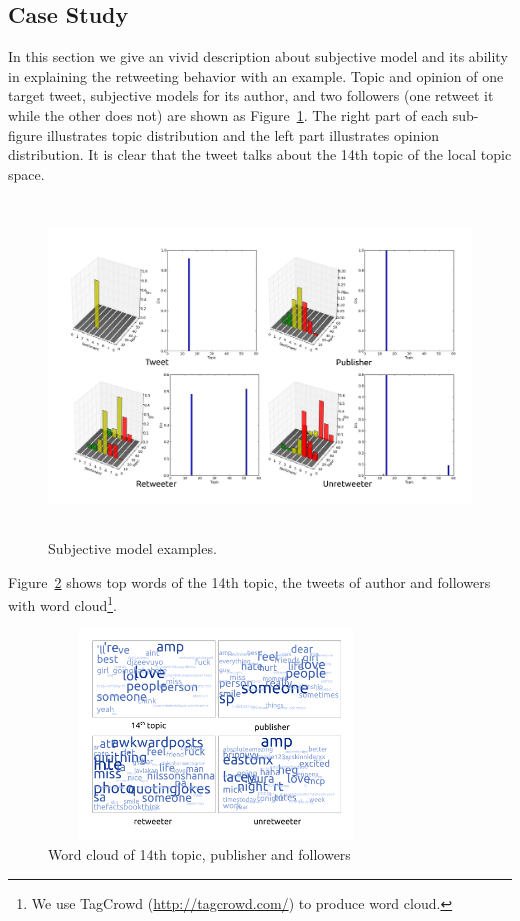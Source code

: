 \documentclass[letterpaper]{article}
\begin{document}
\subsection{Case Study}
\label{example}
In this section we give an vivid description about subjective model and its ability in explaining the retweeting behavior with an example. 
Topic and opinion of one target tweet, subjective models for its author, and two followers (one retweet it while the other does not) are shown as Figure~\ref{fig2}. 
The right part of each sub-figure illustrates topic distribution and the left part illustrates opinion distribution. 
It is clear that the tweet talks about the 14th topic of the local topic space. 
\begin{figure}[htb]
\centering%
\includegraphics[width=6.0in,height=3.5in]{tweets10.pdf}
\caption{Subjective model examples.}
\label{fig2}
\end{figure}
Figure~\ref{fig3} shows top words of the 14th topic, the tweets of author and followers with word cloud\footnote{We use TagCrowd (\url{http://tagcrowd.com/}) to produce word cloud.}.
\begin{figure}[htb]
\centering
\includegraphics[width=3.5in,height=2.2in]{text_cloud.pdf}
\caption{Word cloud of 14th topic, publisher and followers}
\label{fig3}
\end{figure}
\end{document}
